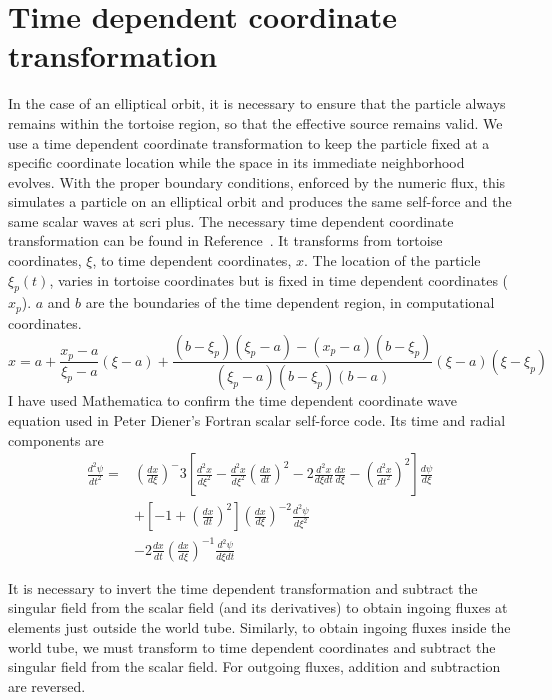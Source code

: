 \section{Time dependent coordinate transformation}

In the case of an elliptical orbit, it is necessary to ensure that the particle always remains within the tortoise region, so that the effective source remains valid. We use a time dependent coordinate transformation to keep the particle fixed at a specific coordinate location while the space in its immediate neighborhood evolves. With the proper boundary conditions, enforced by the numeric flux, this simulates a particle on an elliptical orbit and produces the same self-force and the same scalar waves at scri plus. The necessary time dependent coordinate transformation can be found in Reference~\cite{time_dependent_coordinate_transformation}. It transforms from tortoise coordinates, $\xi$, to time dependent coordinates, $x$. The location of the particle $\xi_p(t)$, varies in tortoise coordinates but is fixed in time dependent coordinates ($x_p$). $a$ and $b$ are the boundaries of the time dependent region, in computational coordinates. 
\begin{equation}
  x=a+\frac{x_p-a}{\xi_p-a}(\xi-a)+\frac{(b-\xi_p)(\xi_p-a)-(x_p-a)(b-\xi_p)}{(\xi_p-a)(b-\xi_p)(b-a)}(\xi-a)(\xi-\xi_p)
\end{equation}
I have used Mathematica to confirm the time dependent coordinate wave equation used in Peter Diener's Fortran scalar self-force code. Its time and radial components are
\begin{eqnarray}
\frac{d^2\psi}{dt^2}=&(\frac{dx}{d\xi})^-3[\frac{d^2x}{d\xi^2}-\frac{d^2x}{d\xi^2}(\frac{dx}{dt})^2-2\frac{d^2x}{d\xi dt}\frac{dx}{d\xi}-(\frac{d^2x}{dt^2})^2]\frac{d\psi}{d\xi}\nonumber\\
&+[-1+(\frac{dx}{dt})^2](\frac{dx}{d\xi})^{-2}\frac{d^2\psi}{d\xi^2}\nonumber\\
&-2\frac{dx}{dt}(\frac{dx}{d\xi})^{-1}\frac{d^2\psi}{d\xi dt}
\end{eqnarray}

It is necessary to invert the time dependent transformation and subtract the singular field from the scalar field (and its derivatives) to obtain ingoing fluxes at elements just outside the world tube. Similarly, to obtain ingoing fluxes inside the world tube, we must transform to time dependent coordinates and subtract the singular field from the scalar field. For outgoing fluxes, addition and subtraction are reversed. 



